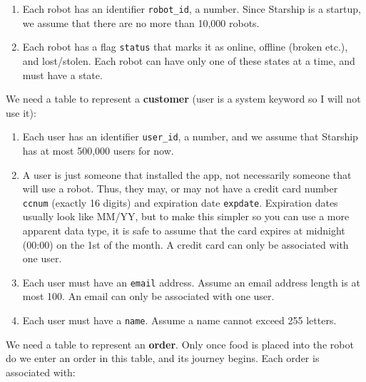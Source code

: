 \documentclass{report}
\renewcommand{\bf}[1]{\textbf{{#1}}}
\renewcommand{\tt}[1]{\texttt{{#1}}}
\begin{document}
\begin{enumerate} 
    \item Each robot has an identifier \tt{robot\_id}, a number. Since Starship is a startup, we
        assume that there are no more than 10,000 robots. 
    \item Each robot has a flag \tt{status} that marks it as online, offline (broken etc.), and
        lost/stolen. Each robot can have only one of these states at a time, and must have a state.
\end{enumerate}

\noindent We need a table to represent a \bf{customer} (user is a system keyword so I will not use it):

\begin{enumerate} 
    \item Each user has an identifier \tt{user\_id}, a number, and we assume that Starship has at
        most 500,000 users for now. 
    \item A user is just someone that installed the app,
        not necessarily someone that will use a robot. Thus, they may, or may not have a credit card
        number \tt{ccnum} (exactly 16 digits) and expiration date \tt{expdate}. Expiration dates
        usually look like MM/YY, but to make this simpler so you can use a more apparent data type, it
        is safe to assume that the card expires at midnight (00:00) on the 1st of the month. A credit
        card can only be associated with one user. 
    \item Each user must have an \tt{email} address.
        Assume an email address length is at most 100. An email can only be associated with one user. 
    \item Each user must have a \tt{name}. Assume a name cannot exceed 255 letters. 
\end{enumerate}

\noindent We need a table to represent an \bf{order}. Only once food is placed into the robot do we
enter an order in this table, and its journey begins. Each order is associated with:
\end{document}
